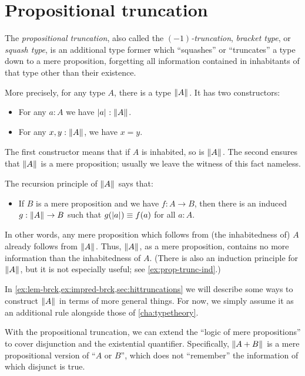 \section{Propositional truncation}
\label{subsec:prop-trunc}

%
%
%
%
%
The \emph{propositional truncation}, also called the \emph{$(-1)$-truncation}, \emph{bracket type}, or \emph{squash type}, is an additional type former which ``squashes'' or ``truncates'' a type down to a mere proposition, forgetting all information contained in inhabitants of that type other than their existence.

More precisely, for any type $A$, there is a type $\mathopen{}\left\Vert A\right\Vert_{}\mathclose{}$.
It has two constructors:
\begin{itemize}
\item For any $a:A$ we have $\mathopen{}\left|a\right|_{}^{}\mathclose{} : \mathopen{}\left\Vert A\right\Vert_{}\mathclose{}$.
\item For any $x,y:\mathopen{}\left\Vert A\right\Vert_{}\mathclose{}$, we have $x=y$.
\end{itemize}
The first constructor means that if $A$ is inhabited, so is $\mathopen{}\left\Vert A\right\Vert_{}\mathclose{}$.
The second ensures that $\mathopen{}\left\Vert A\right\Vert_{}\mathclose{}$ is a mere proposition; usually we leave the witness of this fact nameless.

%
The recursion principle of $\mathopen{}\left\Vert A\right\Vert_{}\mathclose{}$ says that:
\begin{itemize}
\item If $B$ is a mere proposition and we have $f:A\to B$, then there is an induced $g:\mathopen{}\left\Vert A\right\Vert_{}\mathclose{} \to B$ such that $g(\mathopen{}\left|a\right|_{}^{}\mathclose{}) \equiv f(a)$ for all $a:A$.
\end{itemize}
In other words, any mere proposition which follows from (the inhabitedness of) $A$ already follows from $\mathopen{}\left\Vert A\right\Vert_{}\mathclose{}$.
Thus, $\mathopen{}\left\Vert A\right\Vert_{}\mathclose{}$, as a mere proposition, contains no more information than the inhabitedness of $A$.
(There is also an induction principle for $\mathopen{}\left\Vert A\right\Vert_{}\mathclose{}$, but it is not especially useful; see \autoref{ex:prop-trunc-ind}.)

In \autoref{ex:lem-brck,ex:impred-brck,sec:hittruncations} we will describe some ways to construct $\mathopen{}\left\Vert A\right\Vert_{}\mathclose{}$ in terms of more general things.
For now, we simply assume it as an additional rule alongside those of \autoref{cha:typetheory}.

With the propositional truncation, we can extend the ``logic of mere propositions'' to cover disjunction and the existential quantifier.
Specifically, $\mathopen{}\left\Vert A+B\right\Vert_{}\mathclose{}$ is a mere propositional version of ``$A$ or $B$'', which does not ``remember'' the information of which disjunct is true.

